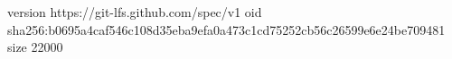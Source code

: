 version https://git-lfs.github.com/spec/v1
oid sha256:b0695a4caf546c108d35eba9efa0a473c1cd75252cb56c26599e6e24be709481
size 22000
